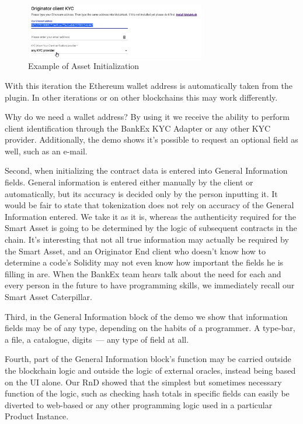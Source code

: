 \documentclass{article}
\begin{document}
\begin{multicols}{2}
\begin{figure}
  \centering
  \includegraphics[width=0.7\textwidth]{originator-client-kyc.png}
  \caption{Example of Asset Initialization}
  \label{fig:originator-client-kyc}
\end{figure}

With this iteration the Ethereum wallet address is automatically taken from the plugin. In other iterations or on other blockchains this may work differently.

Why do we need a wallet address? By using it we receive the ability to perform client identification through the BankEx KYC Adapter or any other KYC provider. Additionally, the demo shows it's possible to request an optional field as well, such as an e-mail. 

Second, when initializing the contract data is entered into General Information fields. General information is entered either manually by the client or automatically, but its accuracy is decided only by the person inputting it. It would be fair to state that tokenization does not rely on accuracy of the General Information entered. We take it as it is, whereas the authenticity required for the Smart Asset is going to be determined by the logic of subsequent contracts in the chain. It's interesting that not all true information may actually be required by the Smart Asset, and an Originator End client who doesn't know how to determine a code's Solidity may not even know how important the fields he is filling in are. When the BankEx team hears talk about the need for each and every person in the future to have programming skills, we immediately recall our Smart Asset Caterpillar.

Third, in the General Information block of the demo we show that information fields may be of any type, depending on the habits of a programmer. A type-bar, a file, a catalogue, digits~--- any type of field at all. 

Fourth, part of the General Information block's function may be carried outside the blockchain logic and outside the logic of external oracles, instead being based on the UI alone. Our RnD showed that the simplest but sometimes necessary function of the logic, such as checking hash totals in specific fields can easily be diverted to web-based or any other programming logic used in a particular Product Instance. 


\end{multicols}
\end{document}
